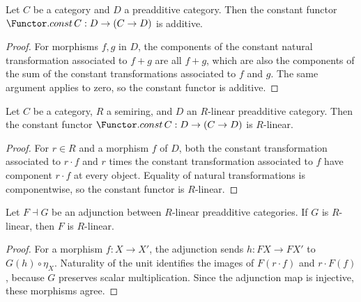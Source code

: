 \begin{lemma}\leanok
  \label{lem:Functor_const_additive}
  Let \(C\) be a category and \(D\) a preadditive category. Then the constant functor
  \(\Functor.const\, C : D \to (C \to D)\) is additive.
\end{lemma}

\begin{proof}

\leanok
  For morphisms \(f,g\) in \(D\), the components of the constant natural transformation associated to \(f+g\) are all \(f+g\), which are also the components of the sum of the constant transformations associated to \(f\) and \(g\). The same argument applies to zero, so the constant functor is additive.
\end{proof}

\begin{lemma}\leanok
  \label{lem:Functor_const_linear}
  Let \(C\) be a category, \(R\) a semiring, and \(D\) an \(R\)-linear preadditive category.
  Then the constant functor \(\Functor.const\, C : D \to (C \to D)\) is \(R\)-linear.
\end{lemma}

\begin{proof}

\leanok
  For \(r\in R\) and a morphism \(f\) of \(D\), both the constant transformation associated to \(r\cdot f\) and \(r\) times the constant transformation associated to \(f\) have component \(r\cdot f\) at every object. Equality of natural transformations is componentwise, so the constant functor is \(R\)-linear.
\end{proof}

\begin{lemma}\leanok
  \label{lemma:Adjunction_left_adjoint_linear}
  Let \(F \dashv G\) be an adjunction between \(R\)-linear preadditive categories. If \(G\) is \(R\)-linear, then \(F\) is \(R\)-linear.
\end{lemma}

\begin{proof}
  \leanok
  For a morphism \(f:X\to X'\), the adjunction sends \(h:FX\to FX'\) to \(G(h)\circ\eta_X\). Naturality of the unit identifies the images of \(F(r\cdot f)\) and \(r\cdot F(f)\), because \(G\) preserves scalar multiplication. Since the adjunction map is injective, these morphisms agree.
\end{proof}

